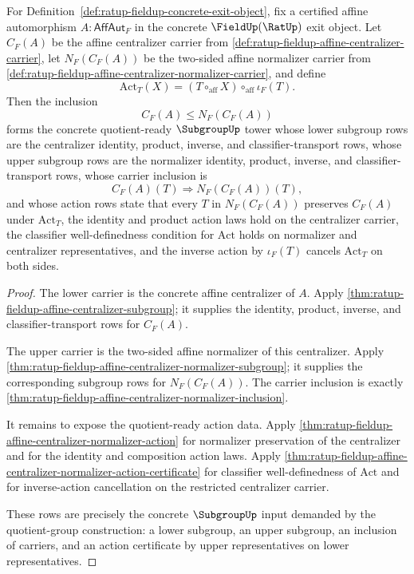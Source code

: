 \begin{theorem}
\label{thm:ratup-fieldup-affine-centralizer-normalizer-subgroup-tower-certificate}
For Definition~\ref{def:ratup-fieldup-concrete-exit-object}, fix a certified
affine automorphism $A:\mathsf{AffAut}_F$ in the concrete $\FieldUp(\RatUp)$
exit object. Let $C_F(A)$ be the affine centralizer carrier from
\autoref{def:ratup-fieldup-affine-centralizer-carrier}, let $N_F(C_F(A))$ be
the two-sided affine normalizer carrier from
\autoref{def:ratup-fieldup-affine-centralizer-normalizer-carrier}, and define
$$
\mathrm{Act}_T(X)=(T\circ_{\mathrm{aff}}X)\circ_{\mathrm{aff}}\iota_F(T).
$$
Then the inclusion
$$
C_F(A)\leq N_F(C_F(A))
$$
forms the concrete quotient-ready $\SubgroupUp$ tower whose lower subgroup rows
are the centralizer identity, product, inverse, and classifier-transport rows,
whose upper subgroup rows are the normalizer identity, product, inverse, and
classifier-transport rows, whose carrier inclusion is
$$
C_F(A)(T)\Rightarrow N_F(C_F(A))(T),
$$
and whose action rows state that every $T$ in $N_F(C_F(A))$ preserves $C_F(A)$
under $\mathrm{Act}_T$, the identity and product action laws hold on the
centralizer carrier, the classifier well-definedness condition for
$\mathrm{Act}$ holds on normalizer and centralizer representatives, and the
inverse action by $\iota_F(T)$ cancels $\mathrm{Act}_T$ on both sides.
\end{theorem}
\begin{proof}
The lower carrier is the concrete affine centralizer of $A$. Apply
\autoref{thm:ratup-fieldup-affine-centralizer-subgroup}; it supplies the
identity, product, inverse, and classifier-transport rows for $C_F(A)$.

The upper carrier is the two-sided affine normalizer of this centralizer. Apply
\autoref{thm:ratup-fieldup-affine-centralizer-normalizer-subgroup}; it supplies
the corresponding subgroup rows for $N_F(C_F(A))$. The carrier inclusion is
exactly \autoref{thm:ratup-fieldup-affine-centralizer-normalizer-inclusion}.

It remains to expose the quotient-ready action data. Apply
\autoref{thm:ratup-fieldup-affine-centralizer-normalizer-action} for
normalizer preservation of the centralizer and for the identity and composition
action laws. Apply
\autoref{thm:ratup-fieldup-affine-centralizer-normalizer-action-certificate} for
classifier well-definedness of $\mathrm{Act}$ and for inverse-action
cancellation on the restricted centralizer carrier.

These rows are precisely the concrete $\SubgroupUp$ input demanded by the
quotient-group construction: a lower subgroup, an upper subgroup, an inclusion
of carriers, and an action certificate by upper representatives on lower
representatives.
\end{proof}

